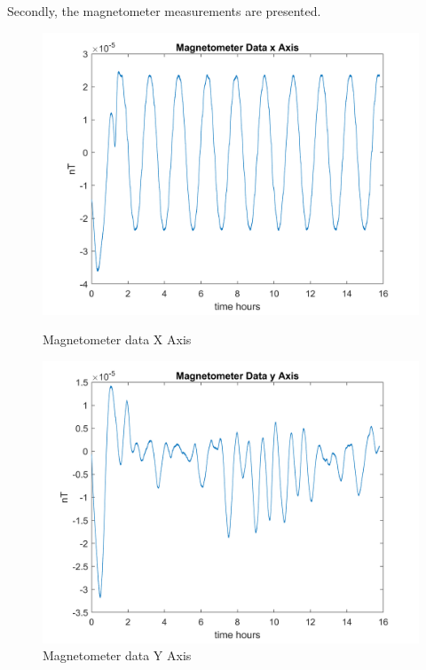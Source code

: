 \begin{itemize}
    Secondly, the magnetometer measurements are presented.
    \begin{figure}[H]
        \centering
        \begin{minipage}{0.32\linewidth}
            \centering
            \includegraphics[width=0.95\linewidth]{res/img/Nadir_EKF/Simulations/Magnetometer data X Axis.png}
            \caption{Magnetometer data X Axis}
            \label{fig:MagnetometerDataX}
        \end{minipage}\hfill
        \begin{minipage}{0.32\linewidth}
            \centering
            \includegraphics[width=0.95\linewidth]{res/img/Nadir_EKF/Simulations/Magnetometer data Y Axis.png}
            \caption{Magnetometer data Y Axis}
            \label{fig:MagnetometerDataY}
        \end{minipage}\hfill

\end{figure}
\end{itemize}
